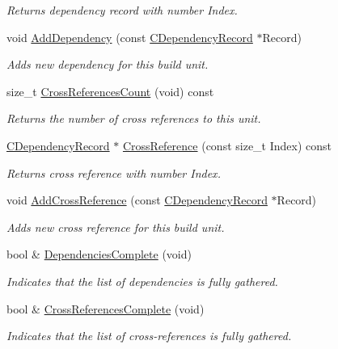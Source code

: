 \begin{DoxyCompactItemize}
\begin{DoxyCompactList}\small\item\em Returns dependency record with number {\itshape Index}. \end{DoxyCompactList}\item 
void \hyperlink{classCDependencyRecord_ad94b22fce77c64cc6947c8dd996ae13f}{Add\-Dependency} (const \hyperlink{classCDependencyRecord}{C\-Dependency\-Record} $\ast$Record)
\begin{DoxyCompactList}\small\item\em Adds new dependency for this build unit. \end{DoxyCompactList}\item 
size\-\_\-t \hyperlink{classCDependencyRecord_a657144d47c4f627460f4073048d5eaf0}{Cross\-References\-Count} (void) const 
\begin{DoxyCompactList}\small\item\em Returns the number of cross references to this unit. \end{DoxyCompactList}\item 
\hyperlink{classCDependencyRecord}{C\-Dependency\-Record} $\ast$ \hyperlink{classCDependencyRecord_ae5d73b29a04dda4aa5731ee825d9ebdd}{Cross\-Reference} (const size\-\_\-t Index) const 
\begin{DoxyCompactList}\small\item\em Returns cross reference with number {\itshape Index}. \end{DoxyCompactList}\item 
void \hyperlink{classCDependencyRecord_a55d06b597f47774630d2e99638eeab30}{Add\-Cross\-Reference} (const \hyperlink{classCDependencyRecord}{C\-Dependency\-Record} $\ast$Record)
\begin{DoxyCompactList}\small\item\em Adds new cross reference for this build unit. \end{DoxyCompactList}\item 
bool \& \hyperlink{classCDependencyRecord_af986b04041c71bd0b81d31c37cd606fb}{Dependencies\-Complete} (void)
\begin{DoxyCompactList}\small\item\em Indicates that the list of dependencies is fully gathered. \end{DoxyCompactList}\item 
bool \& \hyperlink{classCDependencyRecord_af2196e55e8edbb4adceef4732a785ca8}{Cross\-References\-Complete} (void)
\begin{DoxyCompactList}\small\item\em Indicates that the list of cross-\/references is fully gathered. \end{DoxyCompactList}\item 

\end{DoxyCompactItemize}
